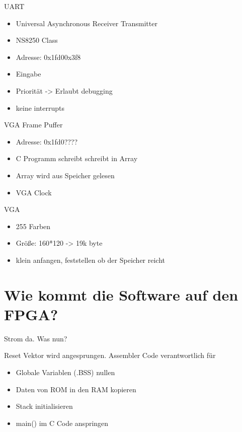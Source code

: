\begin{frame}{UART}

\begin{itemize}
	\item Universal Asynchronous Receiver Transmitter
	\item NS8250 Class 
	\item Adresse: 0x1fd00x3f8
	\item Eingabe
	\item Priorität -> Erlaubt debugging
	\item keine interrupts
\end{itemize}
\begin{center}
\end{center}


\end{frame}

\begin{frame}{VGA Frame Puffer}
	\begin{itemize}
		\item Adresse: 0x1fd0????
		\item C Programm schreibt schreibt in Array
		\item Array wird aus Speicher gelesen
		\item VGA Clock
	\end{itemize}
\end{frame}

\begin{frame}{VGA}
	\begin{itemize}		
		\item 255 Farben
		\item Größe: 160*120 -> 19k byte
		\item klein anfangen, feststellen ob der Speicher reicht
	\end{itemize}
\end{frame}


\section{Wie kommt die Software auf den FPGA?}

\begin{frame}{Strom da. Was nun?}

Reset Vektor wird angesprungen. Assembler Code verantwortlich für

\begin{itemize}
\item Globale Variablen (.BSS) nullen
\item Daten von ROM in den RAM kopieren
\item Stack initialisieren
\item main() im C Code anspringen
\end{itemize}

\end{frame}

